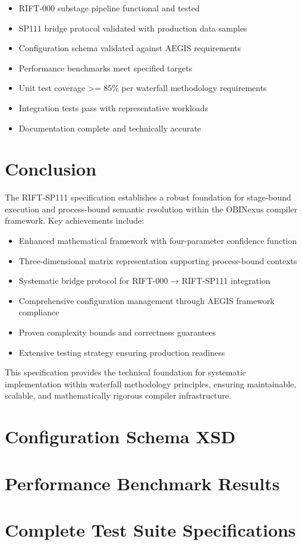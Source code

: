 \documentclass[11pt,a4paper]{article}
\theoremstyle{definition}
\theoremstyle{remark}
\begin{document}
\begin{itemize}
\item[$\square$] RIFT-000 substage pipeline functional and tested
\item[$\square$] SP111 bridge protocol validated with production data samples
\item[$\square$] Configuration schema validated against AEGIS requirements  
\item[$\square$] Performance benchmarks meet specified targets
\item[$\square$] Unit test coverage >= 85\% per waterfall methodology requirements
\item[$\square$] Integration tests pass with representative workloads
\item[$\square$] Documentation complete and technically accurate
\end{itemize}


\section{Conclusion}
\label{sec:conclusion}

The RIFT-SP111 specification establishes a robust foundation for stage-bound execution and process-bound semantic resolution within the OBINexus compiler framework. Key achievements include:

\begin{itemize}
\item Enhanced mathematical framework with four-parameter confidence function
\item Three-dimensional matrix representation supporting process-bound contexts  
\item Systematic bridge protocol for RIFT-000 → RIFT-SP111 integration
\item Comprehensive configuration management through AEGIS framework compliance
\item Proven complexity bounds and correctness guarantees
\item Extensive testing strategy ensuring production readiness
\end{itemize}

This specification provides the technical foundation for systematic implementation within waterfall methodology principles, ensuring maintainable, scalable, and mathematically rigorous compiler infrastructure.

\appendix

\section{Configuration Schema XSD}
\label{app:config-xsd}

\section{Performance Benchmark Results}  
\label{app:benchmarks}

\section{Complete Test Suite Specifications}
\label{app:test-suite}
\end{document}
